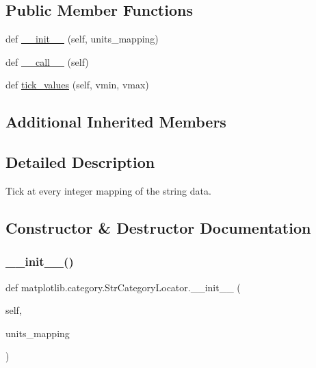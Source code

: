 \subsection*{Public Member Functions}
\begin{DoxyCompactItemize}
\item 
def \hyperlink{classmatplotlib_1_1category_1_1StrCategoryLocator_a42709a5d50db5b94082d41d36839ddf3}{\+\_\+\+\_\+init\+\_\+\+\_\+} (self, units\+\_\+mapping)
\item 
def \hyperlink{classmatplotlib_1_1category_1_1StrCategoryLocator_a85028e8d24c64c7b8a6f31b6a8334d76}{\+\_\+\+\_\+call\+\_\+\+\_\+} (self)
\item 
def \hyperlink{classmatplotlib_1_1category_1_1StrCategoryLocator_adb1272a173b277c65f67446e59ec332c}{tick\+\_\+values} (self, vmin, vmax)
\end{DoxyCompactItemize}
\subsection*{Additional Inherited Members}


\subsection{Detailed Description}
\begin{DoxyVerb}Tick at every integer mapping of the string data.\end{DoxyVerb}
 

\subsection{Constructor \& Destructor Documentation}
\mbox{\label{classmatplotlib_1_1category_1_1StrCategoryLocator_a42709a5d50db5b94082d41d36839ddf3}} 
\subsubsection{\texorpdfstring{\+\_\+\+\_\+init\+\_\+\+\_\+()}{\_\_init\_\_()}}
{\footnotesize\ttfamily def matplotlib.\+category.\+Str\+Category\+Locator.\+\_\+\+\_\+init\+\_\+\+\_\+ (\begin{DoxyParamCaption}\item[{}]{self,  }\item[{}]{units\+\_\+mapping }\end{DoxyParamCaption})}

